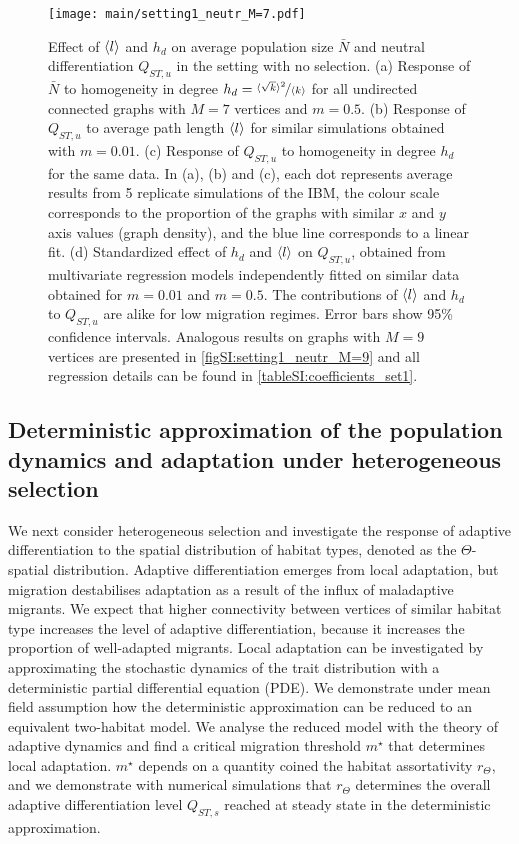 \begin{figure}[ht]
    \centering
      \texttt{[image: main/setting1\_neutr\_M=7.pdf]}
      \caption{\small 
      Effect of $\langle l \rangle$ and $h_d$ on average population size $\bar{N}$ and neutral differentiation $Q_{ST,u}$ in the setting with no selection.
      (a) Response of $\bar{N}$ to homogeneity in degree $h_d = \nicefrac{\langle \sqrt{k} \rangle^2}{\langle k \rangle}$ for all undirected connected graphs with $M=7$ vertices and $m=0.5$.
      (b) Response of $Q_{ST,u}$ to average path length $\langle l \rangle$ for similar simulations obtained with $m=0.01$.
      (c) Response of $Q_{ST,u}$ to homogeneity in degree $h_d$ for the same data.
      In (a), (b) and (c), each dot represents average results from 5 replicate simulations of the IBM, the colour scale corresponds to the proportion of the graphs with similar $x$ and $y$ axis values (graph density), and the blue line corresponds to a linear fit. 
      (d) Standardized effect of $h_d$ and $\langle l \rangle$ on $Q_{ST,u}$, obtained from multivariate regression models independently fitted on similar data obtained for $m = 0.01$ and $m=0.5$.
      The contributions of $\langle l \rangle$ and $h_d$ to $Q_{ST,u}$ are alike for low migration regimes. Error bars show 95\% confidence intervals.
      Analogous results on graphs with $M=9$ vertices are presented in \cref{figSI:setting1_neutr_M=9} and all regression details can be found in \cref{tableSI:coefficients_set1}.
       }
      \label{fig:setting1_neutr_M=7}
\end{figure}
\FloatBarrier

\subsection{Deterministic approximation of the population dynamics and adaptation under heterogeneous selection}\label{sec:result2a}

We next consider heterogeneous selection and investigate the response of adaptive differentiation to the spatial distribution of habitat types, denoted as the $\Theta$-spatial distribution. 
%
Adaptive differentiation emerges from local adaptation, but migration destabilises adaptation as a result of the influx of maladaptive migrants. We expect that higher connectivity between vertices of similar habitat type increases the level of adaptive differentiation, because it increases the proportion of well-adapted migrants. Local adaptation can be investigated by approximating the stochastic dynamics of the trait distribution with a deterministic partial differential equation (PDE). We demonstrate under mean field assumption how the deterministic approximation can be reduced to an equivalent two-habitat model. We analyse the reduced model with the theory of adaptive dynamics \citep{Meszena1997,Mirrahimi2020} and find a critical migration threshold $m^\star$ that determines local adaptation. $m^\star$ depends on a quantity coined the habitat assortativity $r_\Theta$, and we demonstrate with numerical simulations that $r_\Theta$ determines the overall adaptive differentiation level $Q_{ST,s}$ reached at steady state in the deterministic approximation.

